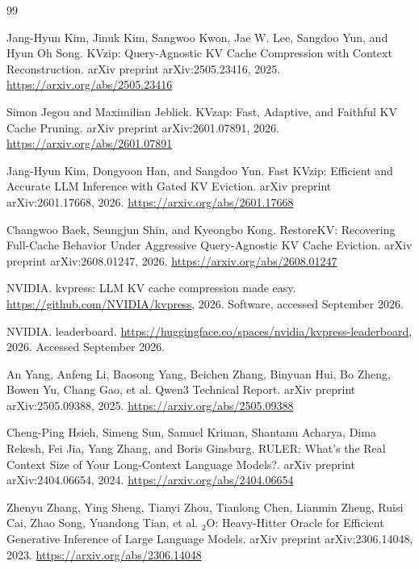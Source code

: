 \documentclass[11pt]{article}
\begin{document}
\begin{thebibliography}{99}

Jang-Hyun Kim, Jinuk Kim, Sangwoo Kwon, Jae W. Lee, Sangdoo Yun, and Hyun Oh Song.
\newblock KVzip: Query-Agnostic KV Cache Compression with Context Reconstruction.
\newblock arXiv preprint arXiv:2505.23416, 2025. \url{https://arxiv.org/abs/2505.23416}

Simon Jegou and Maximilian Jeblick.
\newblock KVzap: Fast, Adaptive, and Faithful KV Cache Pruning.
\newblock arXiv preprint arXiv:2601.07891, 2026. \url{https://arxiv.org/abs/2601.07891}

Jang-Hyun Kim, Dongyoon Han, and Sangdoo Yun.
\newblock Fast KVzip: Efficient and Accurate LLM Inference with Gated KV Eviction.
\newblock arXiv preprint arXiv:2601.17668, 2026. \url{https://arxiv.org/abs/2601.17668}

Changwoo Baek, Seungjun Shin, and Kyeongbo Kong.
\newblock RestoreKV: Recovering Full-Cache Behavior Under Aggressive Query-Agnostic KV Cache Eviction.
\newblock arXiv preprint arXiv:2608.01247, 2026. \url{https://arxiv.org/abs/2608.01247}

NVIDIA.
\newblock kvpress: {LLM} {KV} cache compression made easy.
\newblock \url{https://github.com/NVIDIA/kvpress}, 2026. Software, accessed September 2026.

NVIDIA.
 leaderboard.
\newblock \url{https://huggingface.co/spaces/nvidia/kvpress-leaderboard}, 2026. Accessed September 2026.

An Yang, Anfeng Li, Baosong Yang, Beichen Zhang, Binyuan Hui, Bo Zheng, Bowen Yu, Chang Gao, et al.
\newblock Qwen3 Technical Report.
\newblock arXiv preprint arXiv:2505.09388, 2025. \url{https://arxiv.org/abs/2505.09388}

Cheng-Ping Hsieh, Simeng Sun, Samuel Kriman, Shantanu Acharya, Dima Rekesh, Fei Jia, Yang Zhang, and Boris Ginsburg.
\newblock RULER: What's the Real Context Size of Your Long-Context Language Models?.
\newblock arXiv preprint arXiv:2404.06654, 2024. \url{https://arxiv.org/abs/2404.06654}

Zhenyu Zhang, Ying Sheng, Tianyi Zhou, Tianlong Chen, Lianmin Zheng, Ruisi Cai, Zhao Song, Yuandong Tian, et al.
$_2${O}: Heavy-Hitter Oracle for Efficient Generative Inference of Large Language Models.
\newblock arXiv preprint arXiv:2306.14048, 2023. \url{https://arxiv.org/abs/2306.14048}


\end{thebibliography}
\end{document}
